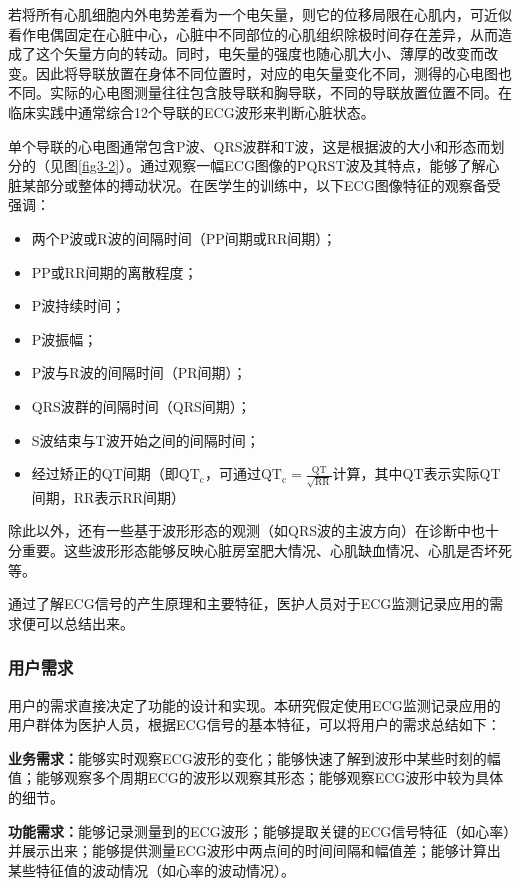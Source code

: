 若将所有心肌细胞内外电势差看为一个电矢量，则它的位移局限在心肌内，可近似看作电偶固定在心脏中心，心脏中不同部位的心肌组织除极时间存在差异，从而造成了这个矢量方向的转动。同时，电矢量的强度也随心肌大小、薄厚的改变而改变。因此将导联放置在身体不同位置时，对应的电矢量变化不同，测得的心电图也不同。实际的心电图测量往往包含肢导联和胸导联，不同的导联放置位置不同。在临床实践中通常综合12个导联的ECG波形来判断心脏状态。

单个导联的心电图通常包含P波、QRS波群和T波，这是根据波的大小和形态而划分的（见图\ref{fig3-2}）。通过观察一幅ECG图像的PQRST波及其特点，能够了解心脏某部分或整体的搏动状况。在医学生的训练中，以下ECG图像特征的观察备受强调：

\begin{itemize}
\item 两个P波或R波的间隔时间（PP间期或RR间期）；
\item PP或RR间期的离散程度；
\item P波持续时间；
\item P波振幅；
\item P波与R波的间隔时间（PR间期）；
\item QRS波群的间隔时间（QRS间期）；
\item S波结束与T波开始之间的间隔时间；
\item 经过矫正的QT间期（即$\mathrm{QT_c}$，可通过$\mathrm{QT_c = \frac{QT}{\sqrt{RR}}}$计算，其中QT表示实际QT间期，RR表示RR间期）
\end{itemize}

除此以外，还有一些基于波形形态的观测（如QRS波的主波方向）在诊断中也十分重要。这些波形形态能够反映心脏房室肥大情况、心肌缺血情况、心肌是否坏死等。

通过了解ECG信号的产生原理和主要特征，医护人员对于ECG监测记录应用的需求便可以总结出来。

\subsubsection{用户需求}
用户的需求直接决定了功能的设计和实现。本研究假定使用ECG监测记录应用的用户群体为医护人员，根据ECG信号的基本特征，可以将用户的需求总结如下：

\textbf{业务需求：}能够实时观察ECG波形的变化；能够快速了解到波形中某些时刻的幅值；能够观察多个周期ECG的波形以观察其形态；能够观察ECG波形中较为具体的细节。

\textbf{功能需求：}能够记录测量到的ECG波形；能够提取关键的ECG信号特征（如心率）并展示出来；能够提供测量ECG波形中两点间的时间间隔和幅值差；能够计算出某些特征值的波动情况（如心率的波动情况）。

